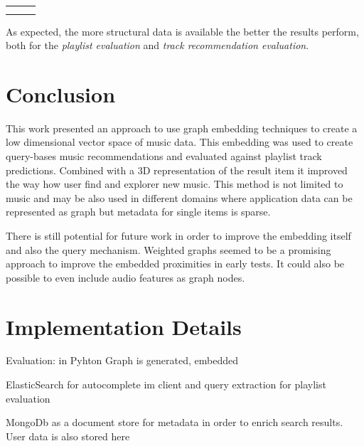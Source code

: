 \documentclass[sigconf]{acmart}
\begin{document}






\begin{tabular}{ccc}\toprule
	&& \\ \midrule[wd]
	&& \\ \cmidrule[wd](trim){<Spalte a> - <Spalte b>}
	&&\\ \bottomrule[wd]
\end{tabular}



As expected, the more structural data is available the better the results perform, both for the \emph{playlist evaluation} and \emph{track recommendation evaluation}.

\section{Conclusion}
This work presented an approach to use graph embedding techniques to create a low dimensional vector space of music data. This embedding was used to create query-bases music recommendations and evaluated against playlist track predictions. Combined with a 3D representation of the result item it improved the way how user find and explorer new music. 
This method is not limited to music and may be also used in different domains where application data can be represented as graph but metadata for single items is sparse.

There is still potential for future work in order to improve the embedding itself and also the query mechanism. Weighted graphs seemed to be a promising approach to improve the embedded proximities in early tests. It could also be possible to even include audio features as graph nodes.






\newpage
\appendix
\section{Implementation Details}


Evaluation:
in Pyhton
Graph is generated, embedded 


ElasticSearch for autocomplete im client and query extraction for playlist evaluation

MongoDb as a document store for metadata in order to enrich search results. User data is also stored here
\end{document}
